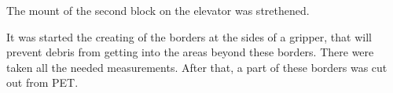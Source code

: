 The mount of the second block on the elevator was strethened.


It was started the creating of the borders at the sides of a gripper, that will prevent debris from getting into the areas beyond these borders. There were taken all the needed measurements. After that, a part of these borders was cut out from PET.
